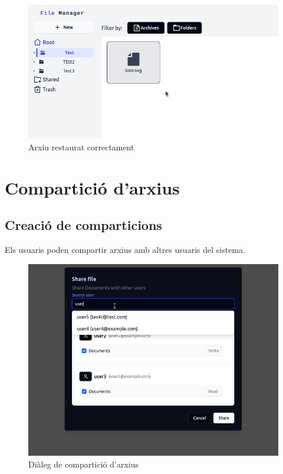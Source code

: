 \begin{figure}[H]
\centering
\includegraphics[width=0.7\linewidth]{Figures/implementacio/restoreFileSucess.png}
\caption{Arxiu restaurat correctament}
\label{fig:restoreFileSucess}
\end{figure}

\section{Compartició d'arxius}

\subsection{Creació de comparticions}

Els usuaris poden compartir arxius amb altres usuaris del sistema.

\begin{figure}[H]
\centering
\includegraphics[width=0.8\linewidth]{Figures/implementacio/shareFileModal.png}
\caption{Diàleg de compartició d'arxius}
\label{fig:shareFileModal}
\end{figure}

